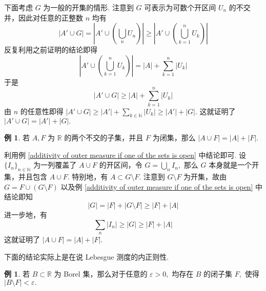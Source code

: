 \documentclass[12pt, a4paper, oneside]{book}
\numberwithin{figure}{section}
\theoremstyle{definition}
\newtheorem{example}[theorem]{例}
\begin{document}
下面考虑 $G$ 为一般的开集的情形. 注意到 $G$ 可表示为可数个开区间 $U_n$ 的不交并，因此对任意的正整数 $n$ 均有
\begin{equation}
    |A'\cup G|=\left|A'\cup \left(\bigcup_n U_n\right)\right|\geq \left|A'\cup \left(\bigcup_{k=1}^n U_k\right)\right|
\end{equation}
反复利用之前证明的结论即得
\begin{equation}
    \left|A'\cup \left(\bigcup_{k=1}^n U_k\right)\right|=|A|+\sum_{k=1}^n |U_k|
\end{equation}
于是
\begin{equation}
    |A'\cup G|\geq |A|+\sum_{k=1}^n |U_k|
\end{equation}
由 $n$ 的任意性即得 $|A'\cup G|\geq |A'|+\sum_{k\in\mathbb N}|U_k|\geq |A'|+|G|.$ 这就证明了 $|A'\cup G|=|A'|+|G|.$

\begin{example}\label{additivity of outer measure if one of the sets is closed}
    若 $A,F$ 为 $\mathbb R$ 的两个不交的子集，并且 $F$ 为闭集，那么 $|A\cup F|=|A|+|F|.$
\end{example}

利用例 \eqref{additivity of outer measure if one of the sets is open} 中结论即可. 设 $\{I_n\}_{n\in\mathbb N}$ 为一列覆盖了 $A\cup F$ 的开区间，令 $G=\bigcup_n I_n,$ 那么 $G$ 本身就是一个开集，并且包含 $A\cup F.$ 
特别地，有 $A\subset G\setminus F.$ 注意到 $G\setminus F$ 为开集，故由 $G=F\cup (G\setminus F)$ 以及例 \eqref{additivity of outer measure if one of the sets is open} 中结论即知
\begin{equation}
    |G|=|F|+|G\setminus F|\geq |F|+|A|
\end{equation}
进一步地，有
\begin{equation}
    \sum_n |I_n|\geq |G|\geq |F|+|A|
\end{equation}
这就证明了 $|A\cup F|=|A|+|F|.$

下面的结论实际上是在说 Lebesgue 测度的内正则性.
\begin{example}
    若 $B\subset\mathbb R$ 为 Borel 集，那么对于任意的 $\varepsilon>0,$ 均存在 $B$ 的闭子集 $F,$ 使得 $|B\setminus F|<\varepsilon.$
\end{example}


\nocite{*}


\end{document}
